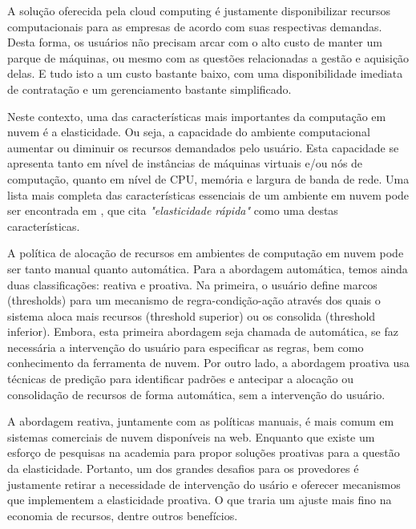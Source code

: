\documentclass[twoside,english,brazilian]{UNISINOSmonografia}
\begin{document}
A solução oferecida pela cloud computing é justamente disponibilizar recursos computacionais para as empresas de acordo com suas respectivas demandas. Desta forma, os usuários não precisam arcar com o alto custo de manter um parque de máquinas, ou mesmo com as questões relacionadas a gestão e aquisição delas. E tudo isto a um custo bastante baixo, com uma disponibilidade imediata de contratação e um gerenciamento bastante simplificado.

Neste contexto, uma das características mais importantes da computação em nuvem é a elasticidade. Ou seja, a capacidade do ambiente computacional aumentar ou diminuir os recursos demandados pelo usuário. Esta capacidade se apresenta tanto em nível de instâncias de máquinas virtuais e/ou nós de computação, quanto em nível de CPU, memória e largura de banda de rede. Uma lista mais completa das características essenciais de um ambiente em nuvem pode ser encontrada em \cite{coutinho}, que cita \textit{"elasticidade rápida"} como uma destas características.

A política de alocação de recursos em ambientes de computação em nuvem pode ser tanto manual quanto automática. Para a abordagem automática, temos ainda duas classificações: reativa e proativa. Na primeira, o usuário define marcos (thresholds) para um mecanismo de regra-condição-ação através dos quais o sistema aloca mais recursos (threshold superior) ou os consolida (threshold inferior). Embora, esta primeira abordagem seja chamada de automática, se faz necessária a intervenção do usuário para especificar as regras, bem como conhecimento da ferramenta de nuvem. Por outro lado, a abordagem proativa usa técnicas de predição para identificar padrões e antecipar a alocação ou consolidação de recursos de forma automática, sem a intervenção do usuário.

A abordagem reativa, juntamente com as políticas manuais, é mais comum em sistemas comerciais de nuvem disponíveis na web. Enquanto que existe um esforço de pesquisas na academia para propor soluções proativas para a questão da elasticidade. Portanto, um dos grandes desafios para os provedores é justamente retirar a necessidade de intervenção do usário e oferecer mecanismos que implementem a elasticidade proativa. O que traria um ajuste mais fino na economia de recursos, dentre outros benefícios.
\end{document}
